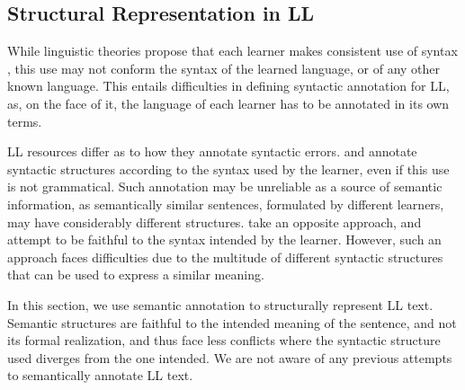 \documentclass[letter,11pt]{article}
\begin{document}

\subsection{Structural Representation in LL}

While linguistic theories propose that each learner
makes consistent use of syntax \cite{huebner1985system,tarone1983variability},
this use may not conform the syntax of the learned language, or of any other known
language. This entails difficulties in defining syntactic annotation for LL,
as, on the face of it, the language of each learner has to be annotated
in its own terms.

LL resources differ as to how they annotate syntactic errors.
 and 
annotate syntactic structures according to the syntax used
by the learner, even if this use is not grammatical.
Such annotation may be unreliable as a source of semantic information,
as semantically similar sentences, formulated by different learners,
may have considerably different structures.  take an opposite approach, and attempt
to be faithful to the syntax intended by the learner. However, such an
approach faces difficulties due to the multitude of different syntactic
structures that can be used to express a similar meaning.


In this section, we use semantic annotation to structurally
represent LL text. Semantic structures are faithful to the intended
meaning of the sentence, and not its formal realization, and thus face
less conflicts where the syntactic structure used diverges from
the one intended. We are not aware of any previous attempts to semantically
annotate LL text.
\end{document}
